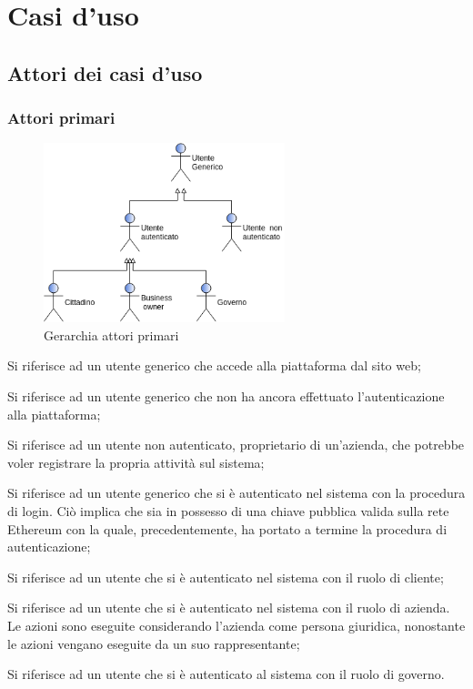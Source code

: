 \section{Casi d'uso} 
\subsection{Attori dei casi d'uso}
\subsubsection{Attori primari}
\begin{figure}[h]
	\includegraphics[width=7cm]{res/images/attori_primari.png}
	\centering
	\caption{Gerarchia attori primari}
\end{figure}
\begin{description}[style=nextline]
	\item[Utente Generico]
	Si riferisce ad un utente generico che accede alla piattaforma dal sito web;
	\item[Utente non autenticato]
	Si riferisce ad un utente generico che non ha ancora effettuato l'autenticazione alla piattaforma;
	\item[Proprietario d'azienda] Si riferisce ad un utente non autenticato, proprietario di un'azienda, che potrebbe voler registrare la propria attività sul sistema;
	\item[Utente autenticato]
	Si riferisce ad un utente generico che si è autenticato nel sistema con la procedura di login. Ciò implica che sia in possesso di una chiave pubblica valida sulla rete Ethereum con la quale, precedentemente, ha portato a termine la procedura di autenticazione;
	\item[Cittadino] Si riferisce ad un utente che si è autenticato nel sistema con il ruolo di cliente;
	\item[Azienda] Si riferisce ad un utente che si è autenticato nel sistema con il ruolo di azienda. Le azioni sono eseguite considerando l'azienda come persona giuridica, nonostante le azioni vengano eseguite da un suo rappresentante;
	\item[Governo\glo] Si riferisce ad un utente che si è autenticato al sistema con il ruolo di governo\glo.
\end{description}
